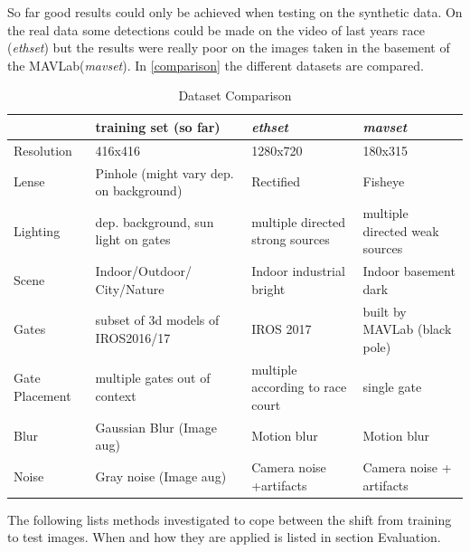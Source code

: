 \documentclass{article}
\begin{document}
So far good results could only be achieved when testing on the synthetic data. On the real data some detections could be made on the video of last years race (\textit{ethset}) but the results were really poor on the images taken in the basement of the MAVLab(\textit{mavset}). In \autoref{comparison} the different datasets are compared.
\begin{table}[]
	\centering
	\caption{Dataset Comparison}
	\label{comparison}
	\begin{tabular}{p{3cm}|p{4cm}|p{4cm}|p{4cm}}
					&  training set (\textbf{so far})& \textit{ethset} 					& \textit{mavset}	\\
					\hline
		Resolution 	&  416x416								  &  1280x720 								&  180x315			\\
		\hline
		Lense		&  Pinhole (might vary dep. on background)&  Rectified							&  Fisheye		  	\\
		\hline
		Lighting	&  dep. background, sun light on gates	  &  multiple directed strong sources	&  multiple directed weak sources\\ 
		\hline
		Scene		&  Indoor/Outdoor/ City/Nature			  &  Indoor industrial bright			&  Indoor basement dark	\\
		\hline
		Gates		&  subset of 3d models of IROS2016/17	  &  IROS 2017							&  built by MAVLab (black pole)	\\
		\hline
		Gate Placement & multiple gates out of context 		  &  multiple according to race court	&  single gate		\\
		\hline
		Blur		&  Gaussian Blur (Image aug)			  &  Motion blur						&  Motion blur 	\\
		\hline
		Noise		&  Gray noise (Image aug)				  &  Camera noise +artifacts			&  Camera noise + artifacts	\\
		\hline
	\end{tabular}
\end{table}

The following lists methods investigated to cope between the shift from training to test images. When and how they are applied is listed in section Evaluation.
\end{document}

